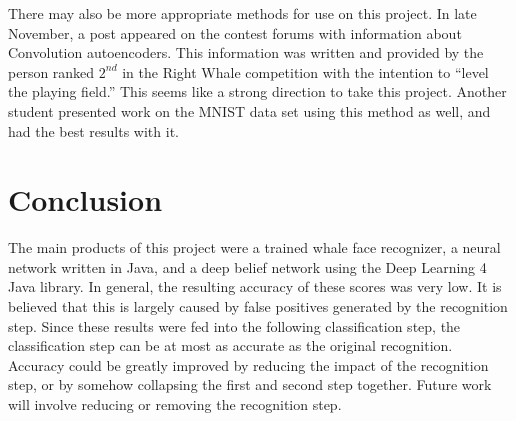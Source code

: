 \documentclass[10pt]{IEEEtran}
\newcommand{\?}{\stackrel{?}{=}}
\begin{document}
There may also be more appropriate methods for use on this project. In late 
November, a post appeared on the contest forums with information about 
Convolution autoencoders\cite{autoencode}. This information was written and 
provided by the person ranked $2^{nd}$ in the Right Whale competition with
the intention to ``level the playing field.'' This seems like a strong direction
to take this project. Another student presented work on the MNIST data set 
using this method as well, and had the best results with it. 

\section{Conclusion}
The main products of this project were a trained whale face recognizer, a neural
network written in Java, and a deep belief network using the Deep Learning 4 Java
library. In general, the resulting accuracy of these scores was very low. It
is believed that this is largely caused by false positives generated 
by the recognition step. Since these results were fed into the following classification
step, the classification step can be at most as accurate as the original 
recognition. Accuracy could be greatly improved by reducing the impact of the
recognition step, or by somehow collapsing the first and second step together.
Future work will involve reducing or removing the recognition step.
\end{document}
